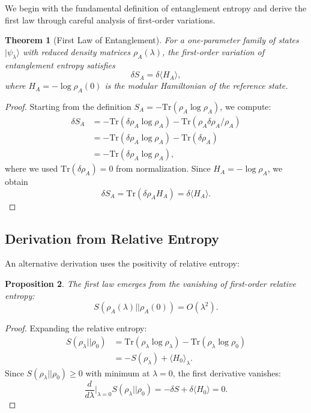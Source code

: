 \documentclass[11pt,letterpaper]{article}
\newtheorem{theorem}{Theorem}[section]
\newtheorem{proposition}[theorem]{Proposition}
\begin{document}
We begin with the fundamental definition of entanglement entropy and derive the first law through careful analysis of first-order variations.

\begin{theorem}[First Law of Entanglement]
For a one-parameter family of states $|\psi_\lambda\rangle$ with reduced density matrices $\rho_A(\lambda)$, the first-order variation of entanglement entropy satisfies
\begin{equation}
\delta S_A = \delta\langle H_A\rangle,
\end{equation}
where $H_A = -\log \rho_A(0)$ is the modular Hamiltonian of the reference state.
\end{theorem}

\begin{proof}
Starting from the definition $S_A = -\text{Tr}(\rho_A \log \rho_A)$, we compute:
\begin{align}
\delta S_A &= -\text{Tr}(\delta\rho_A \log \rho_A) - \text{Tr}(\rho_A \delta\rho_A/\rho_A)\\
&= -\text{Tr}(\delta\rho_A \log \rho_A) - \text{Tr}(\delta\rho_A)\\
&= -\text{Tr}(\delta\rho_A \log \rho_A),
\end{align}
where we used $\text{Tr}(\delta\rho_A) = 0$ from normalization. Since $H_A = -\log \rho_A$, we obtain
\begin{equation}
\delta S_A = \text{Tr}(\delta\rho_A H_A) = \delta\langle H_A\rangle.
\end{equation}
\end{proof}

\subsection{Derivation from Relative Entropy}

An alternative derivation uses the positivity of relative entropy:

\begin{proposition}
The first law emerges from the vanishing of first-order relative entropy:
\begin{equation}
S(\rho_A(\lambda)||\rho_A(0)) = O(\lambda^2).
\end{equation}
\end{proposition}

\begin{proof}
Expanding the relative entropy:
\begin{align}
S(\rho_\lambda||\rho_0) &= \text{Tr}(\rho_\lambda \log \rho_\lambda) - \text{Tr}(\rho_\lambda \log \rho_0)\\
&= -S(\rho_\lambda) + \langle H_0\rangle_\lambda.
\end{align}
Since $S(\rho_\lambda||\rho_0) \geq 0$ with minimum at $\lambda = 0$, the first derivative vanishes:
\begin{equation}
\frac{d}{d\lambda}\Big|_{\lambda=0} S(\rho_\lambda||\rho_0) = -\delta S + \delta\langle H_0\rangle = 0.
\end{equation}
\end{proof}
\end{document}
